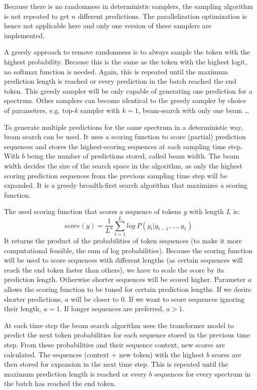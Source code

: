 Because there is no randomness in deterministic samplers, the sampling algorithm is not repeated to get $n$ different predictions. The parallelization optimization is hence not applicable here and only one version of these samplers are implemented.

A greedy approach to remove randomness is to always sample the token with the highest probability. Because this is the same as the token with the highest logit, no softmax function is needed.
Again, this is repeated until the maximum prediction length is reached or every prediction in the batch reached the end token.
This greedy sampler will be only capable of generating one prediction for a spectrum.
Other samplers can become identical to the greedy sampler by choice of parameters, e.g. top-$k$ sampler with $k=1$, beam-search with only one beam \ldots

To generate multiple predictions for the same spectrum in a deterministic way, beam search can be used.
It uses a scoring function to score (partial) prediction sequences and stores the highest-scoring sequences at each sampling time step.
With $b$ being the number of predictions stored, called beam width.
The beam width decides the size of the search space in the algorithm, as only the highest scoring prediction sequences from the previous sampling time step will be expanded.
It is a greedy breadth-first search algorithm that maximizes a scoring function.

The used scoring function that scores a sequence of tokens $y$ with length $L$ is:
\[score(y) = \frac{1}{L^a} \sum\limits_{t=1}^{L}log\ P(y_t | y_{t-1},\dots,y_{1})\]
It returns the product of the probabilities of token sequences (to make it more computational feasible, the sum of log probabilities).
Because the scoring function will be used to score sequences with different lengths (as certain sequences will reach the end token faster than others),
we have to scale the score by its prediction length. Otherwise shorter sequences will be scored higher.
Parameter $a$ allows the scoring function to be tuned for certain prediction lengths.
If we desire shorter predictions, $a$ will be closer to 0.
If we want to score sequences ignoring their length, $a=1$. 
If longer sequences are preferred, $a>1$.

At each time step the beam search algorithm uses the transformer model to predict the next token probabilities for each sequence stored in the previous time step.
From these probabilities and their sequence context, new scores are calculated.
The sequences (context + new token) with the highest $b$ scores are then stored for expansion in the next time step.
This is repeated until the maximum prediction length is reached or every $b$ sequences for every spectrum in the batch has reached the end token.

